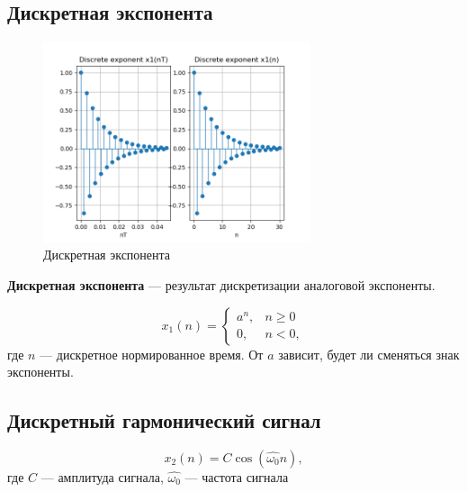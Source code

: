 \documentclass[a4paper, 14pt]{extarticle}
\begin{document}
\clearpage
\subsection{Дискретная экспонента}
\begin{figure}[h]
    \centering
    \includegraphics[width=0.7\textwidth]{img/signals/3.png}
    \caption{Дискретная экспонента}%
    \label{img:}
\end{figure}

\textbf{Дискретная экспонента} --- результат дискретизации аналоговой экспоненты.

\begin{equation}
    x_1(n) = \begin{cases}
        a^n, &n \ge 0 \\
        0, &n < 0,
    \end{cases}
\end{equation}
где $n$ --- дискретное нормированное время. От $a$ зависит, будет ли сменяться знак экспоненты.

\clearpage
\subsection{Дискретный гармонический сигнал}
\begin{equation}
    x_2(n) = C \cos (\hat{ \omega_0 } n),
\end{equation}
где $C$ --- амплитуда сигнала, $\hat{ \omega_0 }$ --- частота сигнала
\end{document}
